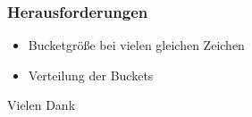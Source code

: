 \documentclass{beamer}
\begin{document}
\begin{frame}
\frametitle{Herausforderungen}
\begin{itemize}
\item Bucketgr\"o\ss{}e bei vielen gleichen Zeichen
\item Verteilung der Buckets
\end{itemize}
\end{frame}
\begin{frame}


\Huge{\centerline{Vielen Dank}}
\end{frame}

\end{document}
